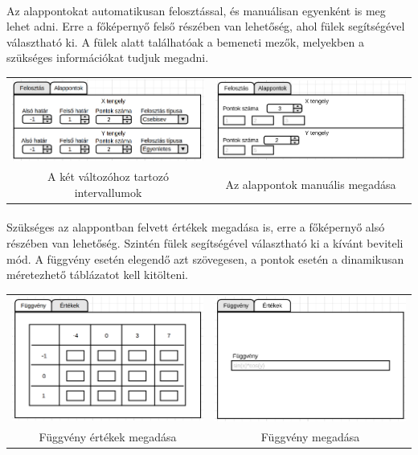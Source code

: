 \documentclass[12pt]{report}
\begin{document}
\paragraph{}
Az alappontokat automatikusan felosztással, és manuálisan egyenként is meg lehet adni. Erre a főképernyő felső részében van lehetőség, ahol fülek segítségével választható ki. A fülek alatt találhatóak a bemeneti mezők, melyekben a szükséges információkat tudjuk megadni. \\
\begin{tabular}{cc}
\includegraphics[width=7cm]{pics/graphics/partition2} & \includegraphics[width=7cm]{pics/graphics/partition1} \\
{\footnotesize A két változóhoz tartozó intervallumok} & {\footnotesize Az alappontok manuális megadása} 
\end{tabular}
\paragraph{}
Szükséges az alappontban felvett értékek megadása is, erre a főképernyő alsó részében van lehetőség. Szintén fülek segítségével választható ki a kívánt beviteli mód. A függvény esetén elegendő azt szövegesen, a pontok esetén a dinamikusan méretezhető táblázatot kell kitölteni. \\
\begin{tabular}{cc}
\includegraphics[width=7cm]{pics/graphics/input1} & \includegraphics[width=7cm]{pics/graphics/input2} \\
{\footnotesize Függvény értékek megadása} & {\footnotesize Függvény megadása} 
\end{tabular}
\end{document}
